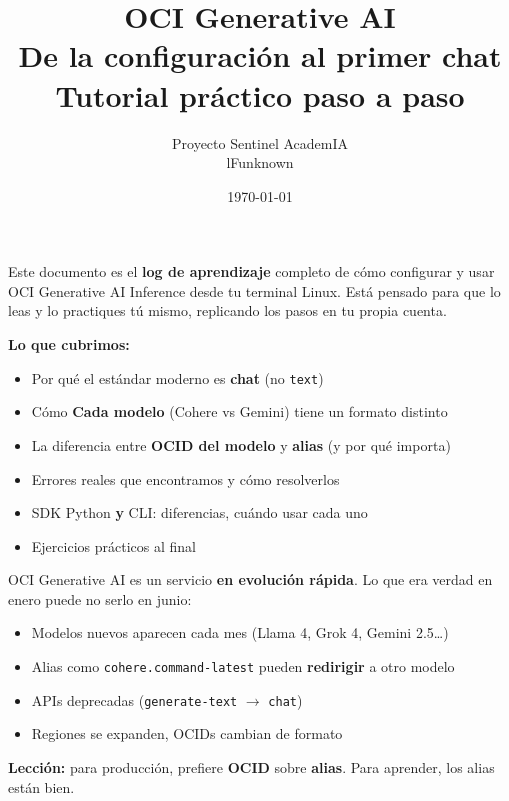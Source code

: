 \documentclass[11pt,a4paper,oneside]{article}
\title{\Huge\textbf{OCI Generative AI} \\[0.3em]
       \Large De la configuración al primer chat \\[0.5em]
       \normalsize Tutorial práctico paso a paso}
\author{Proyecto Sentinel AcademIA \\ \small lFunknown}
\date{\today}
\begin{document}
\maketitle
\thispagestyle{empty}

\begin{tcolorbox}[colback=blue!5!white,colframe=infoblue,title={\textbf{¿Qué aprenderás en este tutorial?}}]
Este documento es el \textbf{log de aprendizaje} completo de cómo configurar y usar OCI Generative AI Inference desde tu terminal Linux. Está pensado para que lo leas y lo practiques tú mismo, replicando los pasos en tu propia cuenta.

\textbf{Lo que cubrimos:}
\begin{itemize}
  \item Por qué el estándar moderno es \textbf{chat} (no \texttt{text})
  \item Cómo \textbf{Cada modelo} (Cohere vs Gemini) tiene un formato distinto
  \item La diferencia entre \textbf{OCID del modelo} y \textbf{alias} (y por qué importa)
  \item Errores reales que encontramos y cómo resolverlos
  \item SDK Python \textbf{y} CLI: diferencias, cuándo usar cada uno
  \item Ejercicios prácticos al final
\end{itemize}
\end{tcolorbox}

\begin{tcolorbox}[colback=warnorange!5!white,colframe=warnorange,title={\textbf{Disclaimer: Oracle + IA cambian constantemente}}]
OCI Generative AI es un servicio \textbf{en evolución rápida}. Lo que era verdad en enero puede no serlo en junio:

\begin{itemize}
  \item Modelos nuevos aparecen cada mes (Llama 4, Grok 4, Gemini 2.5\ldots)
  \item Alias como \texttt{cohere.command-latest} pueden \textbf{redirigir} a otro modelo
  \item APIs deprecadas (\texttt{generate-text} $\rightarrow$ \texttt{chat})
  \item Regiones se expanden, OCIDs cambian de formato
\end{itemize}

\textbf{Lección:} para producción, prefiere \textbf{OCID} sobre \textbf{alias}. Para aprender, los alias est\'an bien.
\end{tcolorbox}
\end{document}
